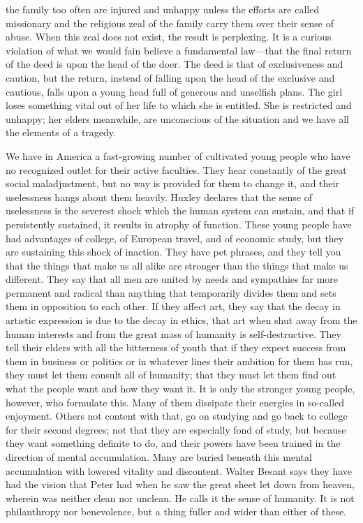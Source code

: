 the family too often are injured and unhappy unless the efforts are
called missionary and the religious zeal of the family carry them over
their sense of abuse. When this zeal does not exist, the result is
perplexing. It is a curious violation of what we would fain believe a
fundamental law---that the final return of the deed is upon the head
of the doer. The deed is that of exclusiveness  and caution,
but the return, instead of falling upon the head of the exclusive and
cautious, falls upon a young head full of generous and unselfish
plans. The girl loses something vital out of her life to which she is
entitled. She is restricted and unhappy; her elders meanwhile, are
unconscious of the situation and we have all the elements of a
tragedy.

We have in America a fast-growing number of cultivated young people
who have no recognized outlet for their active faculties. They hear
constantly of the great social maladjustment, but no way is provided
for them to change it, and their uselessness hangs about them heavily.
Huxley declares that the sense of uselessness is the severest shock
which the human system can sustain, and that if persistently
sustained, it results in atrophy of function. These young people have
had advantages of college, of European travel, and of economic study,
but they are sustaining this shock of inaction. They have pet phrases,
and they tell you that the things that make us all alike are stronger
than the things that make us different. They say that all men are
united by needs and sympathies far more permanent and radical than
anything that temporarily divides them and sets them in opposition to
each other. If they affect art, they say that the decay in artistic
expression is due to the decay in ethics, that art when shut away from
the human interests and from the great mass of humanity is
self-destructive. They tell their elders with all the bitterness of
youth that if they expect success from them in business or politics or
in whatever lines their ambition for them has run, they must let them
consult all of humanity; that they must let them  find out
what the people want and how they want it. It is only the stronger
young people, however, who formulate this. Many of them dissipate
their energies in so-called enjoyment. Others not content with that,
go on studying and go back to college for their second degrees; not
that they are especially fond of study, but because they want
something definite to do, and their powers have been trained in the
direction of mental accumulation. Many are buried beneath this mental
accumulation with lowered vitality and discontent. Walter Besant says
they have had the vision that Peter had when he saw the great sheet
let down from heaven, wherein was neither clean nor unclean. He calls
it the sense of humanity. It is not philanthropy nor benevolence, but
a thing fuller and wider than either of these.

